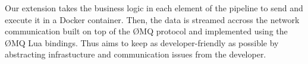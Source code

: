 Our extension takes the business logic in each element of the pipeline to send and execute it in a Docker container.
Then, the data is streamed accross the network communication built on top of the ØMQ protocol and implemented using the ØMQ Lua bindings\cite{github:lzmq}.
Thus \SYS aims to keep as developer-friendly as possible by abstracting infrastucture and communication issues from the developer.
